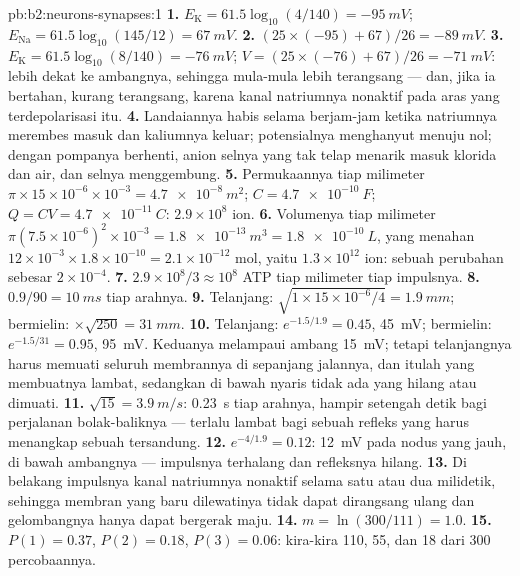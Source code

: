 \begin{solution}{pb:b2:neurons-synapses:1}
\textbf{1.} $E_{\mathrm K} = 61.5\log_{10}(4/140) = \qty{-95}{mV}$;
$E_{\mathrm{Na}} = 61.5\log_{10}(145/12) = \qty{+67}{mV}$.
\textbf{2.} $(25\times(-95) + 67)/26 = \qty{-89}{mV}$.
\textbf{3.} $E_{\mathrm K} = 61.5\log_{10}(8/140) = \qty{-76}{mV}$;
$V = (25\times(-76) + 67)/26 = \qty{-71}{mV}$: lebih dekat ke
ambangnya, sehingga mula-mula lebih terangsang --- dan, jika ia
bertahan, kurang terangsang, karena kanal natriumnya nonaktif pada aras
yang terdepolarisasi itu.
\textbf{4.} Landaiannya habis selama berjam-jam ketika natriumnya
merembes masuk dan kaliumnya keluar; potensialnya menghanyut menuju
nol; dengan pompanya berhenti, anion selnya yang tak telap menarik
masuk klorida dan air, dan selnya menggembung.
\textbf{5.} Permukaannya tiap milimeter $\pi\times 15\times 10^{-6}\times
10^{-3} = \qty{4.7e-8}{m^2}$; $C = \qty{4.7e-10}{F}$; $Q = CV =
\qty{4.7e-11}{C}$: $2.9\times 10^{8}$ ion.
\textbf{6.} Volumenya tiap milimeter $\pi(7.5\times 10^{-6})^{2}\times
10^{-3} = \qty{1.8e-13}{m^3} = \qty{1.8e-10}{L}$, yang menahan $12\times
10^{-3}\times 1.8\times 10^{-10} = 2.1\times 10^{-12}$ mol, yaitu $1.3\times
10^{12}$ ion: sebuah perubahan sebesar $2\times 10^{-4}$.
\textbf{7.} $2.9\times 10^{8}/3 \approx 10^{8}$ ATP tiap milimeter tiap
impulsnya.
\textbf{8.} $0.9/90 = \qty{10}{ms}$ tiap arahnya.
\textbf{9.} Telanjang: $\sqrt{1\times 15\times 10^{-6}/4} = \qty{1.9}{mm}$;
bermielin: $\times\sqrt{250} = \qty{31}{mm}$.
\textbf{10.} Telanjang: $e^{-1.5/1.9} = 0.45$, \qty{45}{mV};
bermielin: $e^{-1.5/31} = 0.95$, \qty{95}{mV}. Keduanya melampaui
ambang \qty{15}{mV}; tetapi  telanjangnya harus memuati seluruh
membrannya di sepanjang jalannya, dan itulah yang membuatnya lambat,
sedangkan di bawah  nyaris tidak ada yang hilang atau dimuati.
\textbf{11.} $\sqrt{15} = \qty{3.9}{m/s}$: \qty{0.23}{s} tiap arahnya,
hampir setengah detik bagi perjalanan bolak-baliknya --- terlalu lambat
bagi sebuah refleks yang harus menangkap sebuah tersandung.
\textbf{12.} $e^{-4/1.9} = 0.12$: \qty{12}{mV} pada nodus yang jauh, di
bawah ambangnya --- impulsnya terhalang dan refleksnya hilang.
\textbf{13.} Di belakang impulsnya kanal natriumnya nonaktif selama
satu atau dua milidetik, sehingga membran yang baru dilewatinya tidak
dapat dirangsang ulang dan gelombangnya hanya dapat bergerak maju.
\textbf{14.} $m = \ln(300/111) = 1.0$.
\textbf{15.} $P(1) = 0.37$, $P(2) = 0.18$, $P(3) = 0.06$: kira-kira
110, 55, dan 18 dari 300 percobaannya.

\end{solution}
